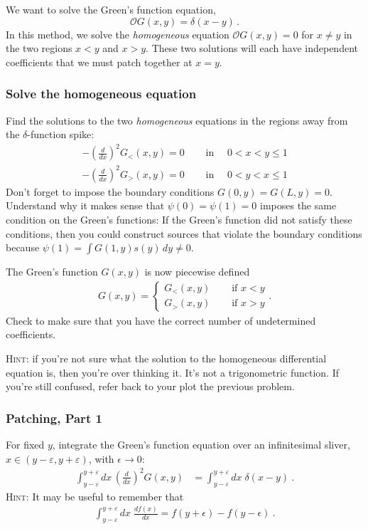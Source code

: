 \documentclass[12pt]{article}
\numberwithin{equation}{subsection}    %
\begin{document}

We want to solve the Green's function equation, $$\mathcal O G(x,y) = \delta(x-y)\, .$$ In this method, we solve the \emph{homogeneous} equation $\mathcal O G(x,y) = 0$ for $x\neq y$ in the two regions $x<y$ and $x>y$. These two solutions will each have independent coefficients that we must patch together at $x=y$.

\subsubsection{Solve the homogeneous equation}

Find the solutions to the two \emph{homogeneous} equations in the regions away from the $\delta$-function spike:
\begin{align}
 	-\left(\frac{d}{dx}\right)^2 G_{<}(x,y) = 0  
 	& \quad\text{ in }\quad 0 < x < y \leq 1 
 	\\
 	-\left(\frac{d}{dx}\right)^2 G_{>}(x,y) = 0  
 	& \quad\text{ in }\quad 0 < y < x \leq 1
\end{align}
Don't forget to impose the boundary conditions $G(0, y) = G(L,y) = 0$. Understand why it makes sense that $\psi(0) = \psi(1) = 0$ imposes the same condition on the Green's functions: If the Green's function did not satisfy these conditions, then you could construct sources that violate the boundary conditions because $\psi(1) = \int G(1,y) s(y)\, dy \neq 0$.

The Green's function $G(x,y)$ is now piecewise defined
\begin{align}G(x,y) = \left\{ 
\begin{array}{ll}
 	G_<(x,y) & \quad\text{ if } x<y\\
 	G_>(x,y) & \quad\text{ if } x>y
 \end{array}\right. .
 \label{eq:piecewise:def}
 \end{align}
Check to make sure that you have the correct number of undetermined coefficients. 

\textsc{Hint}: if you're not sure what the solution to the homogeneous differential equation is, then you're over thinking it. It's not a trigonometric function. If you're still confused, refer back to your plot the previous problem.

\subsubsection{Patching, Part 1}
For fixed $y$, integrate the Green's function equation over an infinitesimal sliver, $x \in (y-\varepsilon, y + \varepsilon)$, with $\epsilon \to 0$: 
\begin{align}
	\int_{y-\varepsilon}^{y+\varepsilon} dx\, \left(\frac{d}{dx}\right)^2 G(x,y) &=  
	\int_{y-\varepsilon}^{y+\varepsilon} dx\; \delta(x-y)
	\ .
	\label{eq:patching:1}
\end{align}
\textsc{Hint}: It may be useful to remember that
\begin{align}
	\int_{y-\varepsilon}^{y+\varepsilon} dx\; \frac{df(x)}{dx} = f(y+\epsilon) - f(y-\epsilon) \ .
\end{align}
\end{document}
